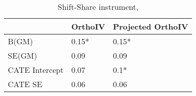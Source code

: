 \begin{table}\centering\caption{Shift-Share instrument, }\begin{tabular}{lll}
\toprule
                & OrthoIV   & Projected OrthoIV   \\
\midrule
 B(GM)          & 0.15*     & 0.15*               \\
 SE(GM)         & 0.09      & 0.09                \\
 CATE Intercept & 0.07      & 0.1*                \\
 CATE SE        & 0.06      & 0.06                \\
\bottomrule
\end{tabular}\end{table}